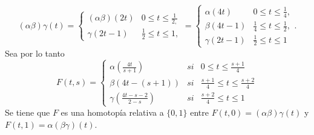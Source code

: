 \documentclass[bibtex, anon]{TEMat-article}
\begin{document}
\begin{demostracion}
\begin{enumerate}
		$$(\alpha\beta)\gamma(t)=\left\{\begin{array}{lc}
		(\alpha\beta)(2t) & 0\leq t\leq\frac{1}{2,}\\
		\gamma(2t-1) & \frac{1}{2}\leq t\leq 1,
		\end{array}\right.=\left\{\begin{array}{lc}
		\alpha(4t) & 0\leq t\leq\frac{1}{4},\\
		\beta(4t-1) & \frac{1}{4}\leq t\leq\frac{1}{2},\\
		\gamma(2t-1) & \frac{1}{2}\leq t\leq 1
		\end{array}\right. .$$
		Sea por lo tanto
		\[
		F(t,s)=\left\{\begin{array}{lcc}
		\alpha\left(\frac{4t}{s+1}\right) & si & 0\leq t\leq\frac{s+1}{4}\\
		\beta\left(4t-(s+1)\right) & si & \frac{s+1}{4}\leq t\leq\frac{s+2}{4}\\
		\gamma\left(\frac{4t-s-2}{2-s}\right) & si & \frac{s+2}{4}\leq t\leq 1
		\end{array}\right.
		\]
		Se tiene que $F$ es una homotopía relativa a $\{0,1\}$ entre $F(t,0)=(\alpha\beta)\gamma(t)$ y $F(t,1)=\alpha(\beta\gamma)(t)$.
		

\end{enumerate}
\end{demostracion}
\end{document}

